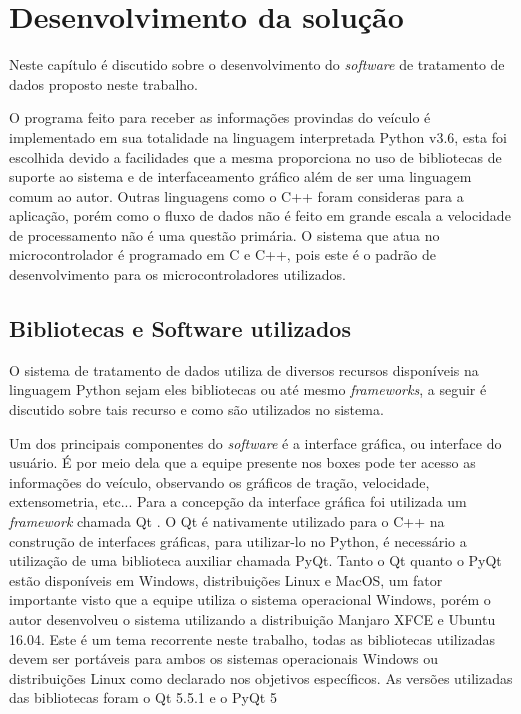 \chapter{Desenvolvimento da solução}
	\label{ch:desenvolvimento}
Neste capítulo é discutido sobre o desenvolvimento do \textit{software} de tratamento de dados proposto neste trabalho. 

O programa feito para receber as informações provindas do veículo é implementado em sua totalidade na linguagem interpretada Python v3.6, esta foi escolhida devido a facilidades que a mesma proporciona no uso de bibliotecas de suporte ao sistema e de interfaceamento gráfico além de ser uma linguagem comum ao autor. Outras linguagens como o C++ foram consideras para a aplicação, porém como o fluxo de dados não é feito em grande escala a velocidade de processamento não é uma questão primária. O sistema que atua no microcontrolador é programado em C e C++, pois este é o padrão de desenvolvimento para os microcontroladores utilizados. 

\section{Bibliotecas e Software utilizados}
O sistema de tratamento de dados utiliza de diversos recursos disponíveis na linguagem Python sejam eles bibliotecas ou até mesmo \textit{frameworks}, a seguir é discutido sobre tais recurso e como são utilizados no sistema. 

Um dos principais componentes do \textit{software} é a interface gráfica, ou interface do usuário. É por meio dela que a equipe presente nos boxes pode ter acesso as informações do veículo, observando os gráficos de tração, velocidade, extensometria, etc... Para a concepção da interface gráfica foi utilizada um \textit{framework} chamada Qt \cite{qt}. O Qt é nativamente utilizado para o C++ na construção de interfaces gráficas, para utilizar-lo no Python, é necessário a utilização de uma biblioteca auxiliar chamada PyQt\cite{pyqt}. Tanto o Qt quanto o PyQt estão disponíveis em Windows, distribuições Linux e MacOS, um fator importante visto que a equipe utiliza o sistema operacional Windows, porém o autor desenvolveu o sistema utilizando a distribuição Manjaro XFCE e Ubuntu 16.04. Este é um tema recorrente neste trabalho, todas as bibliotecas utilizadas devem ser portáveis para ambos os sistemas operacionais Windows ou distribuições Linux como declarado nos objetivos específicos. As versões utilizadas das bibliotecas foram o Qt 5.5.1 e o PyQt 5

